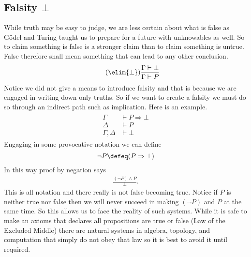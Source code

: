 \subsection{Falsity $\bot$}
While truth may be easy to judge, we are less certain about what is false as 
G\"odel and Turing taught us to prepare for a future with unknowables as well.
So to claim something is false is a stronger claim than to claim something 
is untrue.
False therefore shall mean something that can lead to any other conclusion.
\begin{align}
    \tag{$\elim{\bot}$}
    \frac{\Gamma\vdash \bot}{\Gamma\vdash P}
\end{align}
Notice we did not give a means to introduce falsity and that is because we 
are engaged in writing down only truths.  So if we want to create a falsity 
we must do so through an indirect path such as implication.  Here is an example.
\begin{align}
    \tag{Proof by negation}
    \begin{array}{rl}
    \Gamma & \vdash P\Rightarrow \bot \\
    \Delta & \vdash P \\
    \hline 
    \Gamma,\Delta & \vdash \bot
    \end{array}
\end{align}
Engaging in some provocative notation we can define 
\begin{align*}
    \neg P \defeq (P\Rightarrow \bot)
\end{align*}
In this way proof by negation says 
\begin{align*}
    \frac{(\neg P)\wedge P}{\bot}.
\end{align*}
This is all notation and there really is not false becoming true.  Notice 
if $P$ is neither true nor false then we will never succeed in making 
$(\neg P)$ and $P$ at the same time.  So this allows us to face the reality 
of such systems.  While it is safe to make an axioms that declares all 
propositions are true or false (Law of the Excluded Middle) there are natural 
systems in algebra, topology, and computation that simply do not obey that law 
so it is best to avoid it until required.

